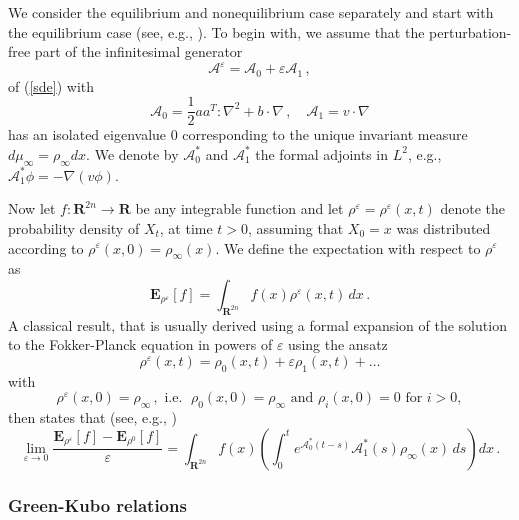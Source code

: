 \documentclass[]{tMPH2e}
\newcommand{\R}{{\mathbf R}}
\newcommand{\eps}{\varepsilon}
\newcommand{\fwg}{{\mathcal A}}
\newcommand{\cA}{\mathcal A}
\newcommand{\bE}{{\mathbf E}}
\newcommand{\wrt}{with respect to }
\begin{document}
We consider the equilibrium and nonequilibrium case separately and start with the equilibrium case (see, e.g., \cite{kubo1957,tuckerman2010statistical}). To begin with, we assume that the perturbation-free part of the infinitesimal generator
\[
\fwg^{\eps} = \fwg_{0} + \eps\fwg_{1}\,, 
\]
of (\ref{sde}) with 
\[
\fwg_{0} = \frac{1}{2}aa^{T}\colon\nabla^{2} + b\cdot\nabla\,,\quad \fwg_{1}=v\cdot\nabla 
\]
has an isolated eigenvalue 0 corresponding to the unique invariant measure $d\mu_{\infty}=\rho_{\infty}dx$. We denote by $\cA_{0}^{*}$ and $\cA_{1}^{*}$ the formal adjoints in $L^{2}$, e.g., $\cA_{1}^{*}\phi=-\nabla(v \phi)$.  


Now let $f\colon\R^{2n}\to\R$ be any integrable function and let $\rho^{\eps}=\rho^{\eps}(x,t)$ denote the probability density of $X_t$, at time $t>0$, assuming that $X_{0}=x$ was distributed according to $\rho^{\eps}(x,0)=\rho_{\infty}(x)$. We define the expectation \wrt $\rho^{\eps}$ as 
\[
\bE_{\rho^{\eps}}[f] = \int_{\R^{2n}} f(x) \rho^{\eps}(x,t) \,dx\,.
\] 
A classical result, that is usually derived using a formal expansion of the solution to the Fokker-Planck equation in powers of $\eps$ using the ansatz 
\[
\rho^{\eps}(x,t)=\rho_{0}(x,t) + \eps\rho_{1}(x,t) + \ldots\] 
with 
\[\rho^{\eps}(x,0)=\rho_{\infty}\,,\textrm{ i.e. }\; \rho_{0}(x,0)=\rho_{\infty}\textrm{  and  } \rho_{i}(x,0)=0\textrm{ for $i>0$},
\] 
then states that (see, e.g., \cite{tuckerman2010statistical,hartmann2010})
\begin{equation}\label{lr}
\lim_{\eps\to 0}\frac{\bE_{\rho^{\eps}}[f] - \bE_{\rho^{0}}[f]}{\eps} =\int_{\R^{2n}}f(x)\left(\int_{0}^{t}e^{\cA_{0}^{*}(t-s)}\cA_{1}^{*}(s)\rho_{\infty}(x)\,ds\right)dx\,.
\end{equation}


\subsubsection*{Green-Kubo relations} 
\end{document}
